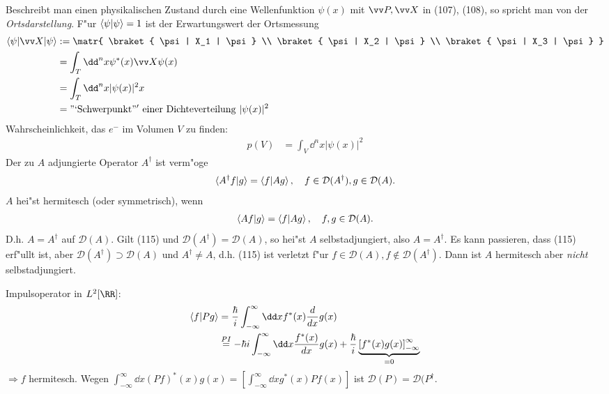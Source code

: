 \documentclass[a4paper]{scrartcl}
\begin{document}
{Beschreibt man einen physikalischen Zustand durch eine Wellenfunktion $\psi(x)$ mit $\vv P, \vv X$ in (107), (108), so spricht man von der \emph{Ortsdarstellung}. F"ur $\braket{ \psi | \psi} = 1$ ist der Erwartungswert der Ortsmessung
\begin{align}
\begin{split}
\braket{ \psi | \vv X | \psi} & := \matr{  \braket{ \psi |  X_1 | \psi} \\ \braket{ \psi |  X_2 | \psi} \\ \braket{ \psi |  X_3 | \psi} } \\
& = \int_T \dd^nx \psi^*(x) \vv X \psi(x) \\
& = \int_T \dd^n x \vert \psi(x) \vert^2 x \\
& = \mathrm{"`Schwerpunkt"' \ einer \ Dichteverteilung \ } \vert \psi(x) \vert^2
\end{split}
\end{align}
Wahrscheinlichkeit, das $e^-$ im Volumen $V$ zu finden:
\begin{align}
p(V) & = \int_V \dd^nx \vert \psi(x) \vert^2
\end{align}
Der zu $A$ adjungierte Operator $A^\dagger$ ist verm"oge
\begin{align}
\braket{ A^\dagger f | g} = \braket{ f | Ag}, \quad f \in \mathcal D(A^\dagger), g \in \mathcal D(A).
\end{align}
$A$ hei"st hermitesch (oder symmetrisch), wenn 
\begin{align}
\braket{ Af | g} = \braket{ f  | Ag }, \quad f,g \in \mathcal D(A).
\end{align}
D.h. $A = A^\dagger$ auf $\mathcal D(A)$. Gilt (115) und $\mathcal D(A^\dagger) = \mathcal D(A)$, so hei"st $A$ selbstadjungiert, also $A = A^\dagger$. Es kann passieren, dass (115) erf"ullt ist, aber $\mathcal D(A^\dagger) \supset \mathcal D(A)$ und $A^\dagger \neq A$, d.h. (115) ist verletzt f"ur $f \in \mathcal D(A), f \notin \mathcal D(A^\dagger)$. Dann ist $A$ hermitesch aber \emph{nicht} selbstadjungiert.

Impulsoperator in $L^2[\RR]$:
\begin{align*}
\braket{ f | Pg} & = \frac \hbar i \int_{-\infty}^\infty \dd x f^*(x) \frac d {dx} g(x) \\
& \stackrel {PI}= -\hbar i \int_{-\infty}^\infty \dd x \frac{ f^*(x)}{dx} g(x) + \frac \hbar i \underbrace{\left[ f^*(x) g(x) \right]_{-\infty}^\infty}_{=0}
\end{align*}
$\Longrightarrow f$ hermitesch. Wegen $\int_{-\infty}^\infty \dd x (Pf)^*(x) g(x) = \left[ \int_{-\infty}^\infty \dd x g^*(x) Pf(x) \right]$ ist $\mathcal D(P) = \mathcal D(P^\dagger$.

}
\end{document}
